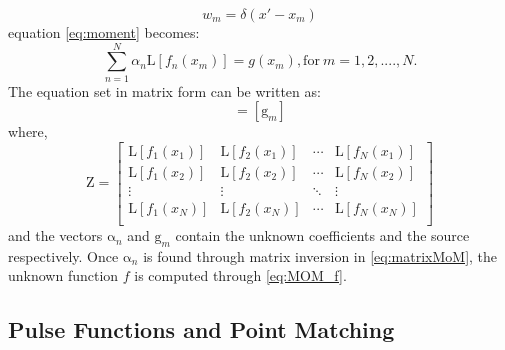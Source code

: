 \documentclass[11pt]{article}
\renewcommand{\^}{\hat}  %
\begin{document}
%
\begin{equation}
  w_m = \delta(x' - x_m)
  \label{eq:delta}
\end{equation}
%
equation \eqref{eq:moment} becomes:
%
\begin{equation}
  \sum \limits_{n = 1}^N \alpha_n  \mathrm L [f_n(x_m)]  = g(x_m), \text{for}\ m = 1,2,....,N.
  \label{eq:moment}
\end{equation}
%
The equation set in matrix form can be written as:
%
\begin{equation}
  [\mathrm Z][\mathrm \alpha_n] = [\mathrm g_m]
  \label{eq:matrixMoM}
\end{equation}
%
where,
\begin{equation}
  \mathrm Z =
  \begin{bmatrix}
    \mathrm L [f_1(x_1)] & \mathrm L [f_2(x_1)] & \cdots & \mathrm L [f_N(x_1)] \\
    \mathrm L [f_1(x_2)] & \mathrm L [f_2(x_2)] & \cdots & \mathrm L [f_N(x_2)] \\
    \vdots & \vdots & \ddots & \vdots \\
    \mathrm L [f_1(x_N)] & \mathrm L [f_2(x_N)] & \cdots & \mathrm L [f_N(x_N)] \\
  \end{bmatrix}
  \label{eq:Zmat}
\end{equation}
%
and the vectors $\mathrm \alpha_n$ and $\mathrm g_m$ contain the unknown coefficients and the source respectively. Once $\mathrm \alpha_n$ is found through matrix inversion in \eqref{eq:matrixMoM}, the unknown function $f$ is computed through \eqref{eq:MOM_f}.
\subsection*{Pulse Functions and Point Matching}
\end{document}

